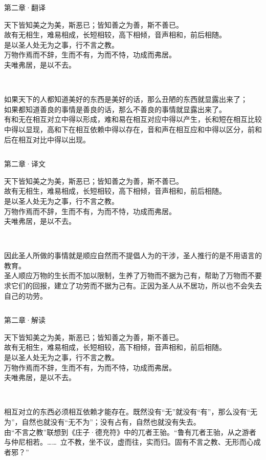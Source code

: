 \documentclass{beamer}
\newcommand{\classical}[1]{\textcolor{classical}{\kaishu #1}}         %
\newcommand{\trans}[1]{\textcolor{trans}{\fangsong #1}}              %
\newcommand{\comment}[1]{\textcolor{comment}{\kaishu #1}}            %
\newcommand{\originaltext}[1]{
	\begin{center}
		\large\classical{#1}
	\end{center}
	}
\begin{document}
\begin{frame}{第二章·翻译}
	\originaltext{
	天下皆知美之为美，斯恶已；皆知善之为善，斯不善已。\\
	故有无相生，难易相成，长短相较，高下相倾，音声相和，前后相随。\\
	是以圣人处无为之事，行不言之教。\\
	万物作焉而不辞，生而不有，为而不恃，功成而弗居。\\夫唯弗居，是以不去。
	}
	\begin{columns}[T]
		\trans{\setlength{\parindent}{2em}\\
		如果天下的人都知道美好的东西是美好的话，那么丑陋的东西就显露出来了；\\
		如果都知道善良的事情是善良的话，那么不善良的事情就显露出来了。\\
		有和无在相互对立中得以形成，难和易在相互对应中得以产生，长和短在相互比较中得以显现，高和下在相互依赖中得以存在，音和声在相互应和中得以区分，前和后在相互对比中得以出现。
		}
	\end{columns}
\end{frame}
\begin{frame}{第二章·译文}
	\originaltext{
	天下皆知美之为美，斯恶已；皆知善之为善，斯不善已。\\
	故有无相生，难易相成，长短相较，高下相倾，音声相和，前后相随。\\
	是以圣人处无为之事，行不言之教。\\
	万物作焉而不辞，生而不有，为而不恃，功成而弗居。\\夫唯弗居，是以不去。
	}
	\begin{columns}[T]
		\trans{\setlength{\parindent}{2em}\\
		因此圣人所做的事情就是顺应自然而不提倡人为的干涉，圣人推行的是不用语言的教育。\\
		圣人顺应万物的生长而不加以限制，生养了万物而不据为己有，帮助了万物而不要求它们的回报，建立了功劳而不据为己有。正因为圣人从不居功，所以也不会失去自己的功劳。
		}
	\end{columns}
\end{frame}

\begin{frame}{第二章·解读}
	\originaltext{
	天下皆知美之为美，斯恶已；皆知善之为善，斯不善已。\\
	故有无相生，难易相成，长短相较，高下相倾，音声相和，前后相随。\\
	是以圣人处无为之事，行不言之教。\\
	万物作焉而不辞，生而不有，为而不恃，功成而弗居。\\夫唯弗居，是以不去。
	}
	\begin{columns}[T]
		\comment{\setlength{\parindent}{2em}\\
		相互对立的东西必须相互依赖才能存在。既然没有“无”就没有“有”，那么没有“无为”，自然也就没有“无不为”；没有占有，自然也就没有失去。\\
		由“不言之教”联想到《庄子·德充符》中的兀者王骀。“鲁有兀者王骀，从之游者与仲尼相若。……\ 立不教，坐不议，虚而往，实而归。固有不言之教、无形而心成者邪？”
		}
	\end{columns}
\end{frame}
\end{document}
